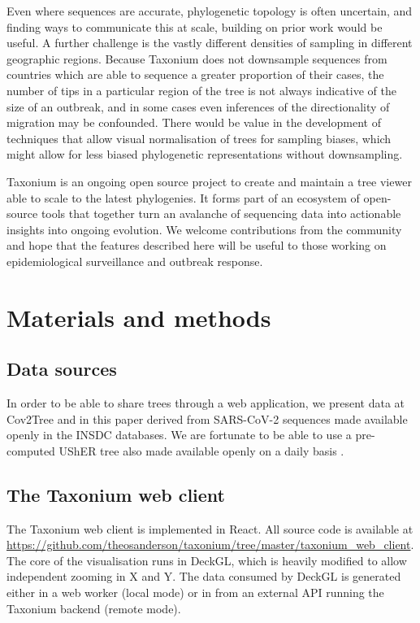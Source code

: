 Even where sequences are accurate, phylogenetic topology is often uncertain, and finding ways to communicate this at scale, building on prior work \citep{densitree} would be useful. A further challenge is the vastly different densities of sampling in different geographic regions. Because Taxonium does not downsample sequences from countries which are able to sequence a greater proportion of their cases, the number of tips in a particular region of the tree is not always indicative of the size of an outbreak, and in some cases even inferences of the directionality of migration may be confounded. There would be value in the development of techniques that allow visual normalisation of trees for sampling biases, which might allow for less biased phylogenetic representations without downsampling.

Taxonium is an ongoing open source project to create and maintain a tree viewer able to scale to the latest phylogenies. It forms part of an ecosystem of open-source tools that together turn an avalanche of sequencing data into actionable insights into ongoing  evolution. We welcome contributions from the community and hope that the features described here will be useful to those working on epidemiological surveillance and outbreak response.

\clearpage{}
\section*{Materials and methods}

\subsection*{Data sources}
In order to be able to share trees through a web application, we present data at Cov2Tree and in this paper derived from SARS-CoV-2 sequences made available openly in the INSDC databases. We are fortunate to be able to use a pre-computed UShER tree also made available openly on a daily basis \citep{McBroome2021}.

\subsection*{The Taxonium web client}
The Taxonium web client is implemented in React. All source code is available at \url{https://github.com/theosanderson/taxonium/tree/master/taxonium_web_client}. The core of the visualisation runs in DeckGL, which is heavily modified to allow independent zooming in X and Y. The data consumed by DeckGL is generated either in a web worker (local mode) or in from an external API running the Taxonium backend (remote mode).

